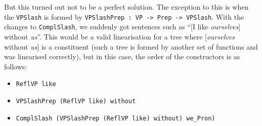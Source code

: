 But this turned out not to be a perfect solution. The exception to this
is when the \texttt{VPSlash} is formed by
\texttt{VPSlashPrep : VP -\textgreater{} Prep -\textgreater{} VPSlash}.
With the changes to \texttt{ComplSlash}, we suddenly got sentences such
as ``{[}I like \emph{ourselves}{]} without \emph{us}''. This would be a
valid linearisation for a tree where {[}\emph{ourselves} without
\emph{us}{]} is a constituent (such a tree is formed by another set of
functions and was linearised correctly), but in this case, the order of
the constructors is as follows:

\begin{itemize}
\item
  \texttt{ReflVP like}

\begin{EmptyItem}
\begin{Highlighting}[]
      \FunctionTok{=}  \NormalTok{;}
\FunctionTok{=}  \OtherTok{=>}  \NormalTok{; } \OtherTok{=>}  
\end{Highlighting}
\end{EmptyItem}
\item
  \texttt{VPSlashPrep (ReflVP like) without}

\begin{EmptyItem}
\begin{Highlighting}[]
      \FunctionTok{=}  \NormalTok{;}
\FunctionTok{=}  \OtherTok{=>}  \NormalTok{; } \OtherTok{=>}  
 \FunctionTok{=} 
\end{Highlighting}
\end{EmptyItem}
\item
  \texttt{ComplSlash (VPSlashPrep (ReflVP like) without) we\_Pron)}

\begin{EmptyItem}
\begin{Highlighting}[]
      \FunctionTok{=}  \NormalTok{;}
\FunctionTok{=}  \OtherTok{=>}  \NormalTok{; } \OtherTok{=>}  
    \FunctionTok{=} 
\end{Highlighting}
\end{EmptyItem}


\end{itemize}
